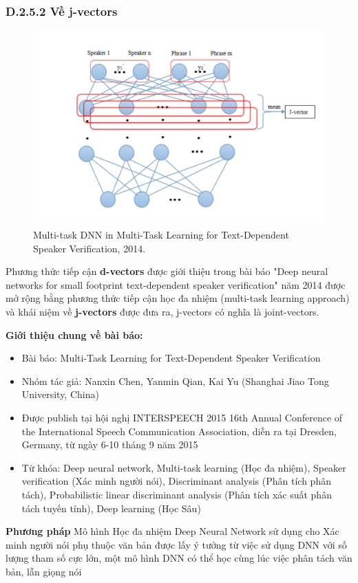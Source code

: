 \documentclass{article}
\begin{document}
	\subsubsection{D.2.5.2 Về j-vectors}
	\begin{figure}[H]
		\centering
		\includegraphics[width=0.75\linewidth]{images/j-vectors.png}
		\caption{Multi-task DNN in Multi-Task Learning for Text-Dependent Speaker Verification, 2014.}
		\label{fig:writing-thesis}
	\end{figure}
	\qquad Phương thức tiếp cận \textbf{d-vectors} được giới thiệu trong bài báo "Deep neural networks for small footprint text-dependent speaker verification" năm 2014 được mở rộng bằng phương thức tiếp cận học đa nhiệm (multi-task learning approach) và khái niệm về \textbf{j-vectors} được đưa ra, j-vectors có nghĩa là joint-vectors.
	
	\textbf{Giới thiệu chung về bài báo:}
	\begin{itemize}
		\item Bài báo: Multi-Task Learning for Text-Dependent Speaker Verification
		\item Nhóm tác giả: Nanxin Chen, Yanmin Qian, Kai Yu (Shanghai Jiao Tong University, China)
		\item Được publish tại hội nghị INTERSPEECH 2015 16th Annual Conference of the International Speech Communication Association, diễn ra tại Dresden, Germany, từ ngày 6-10 tháng 9 năm 2015
		\item Từ khóa: Deep neural network, Multi-task learning (Học đa nhiệm), Speaker verification (Xác minh người nói), Discriminant analysis (Phân tích phân tách), Probabilistic linear discriminant analysis (Phân tích xác suất phân tách tuyến tính), Deep learning (Học Sâu)
	\end{itemize}

	\textbf{Phương pháp}
	Mô hình Học đa nhiệm Deep Neural Network sử dụng cho Xác minh người nói phụ thuộc văn bản được lấy ý tưởng từ việc sử dụng DNN với số lượng tham số cực lớn, một mô hình DNN có thể học cùng lúc việc phân tách văn bản, lẫn giọng nói
	
\end{document}
